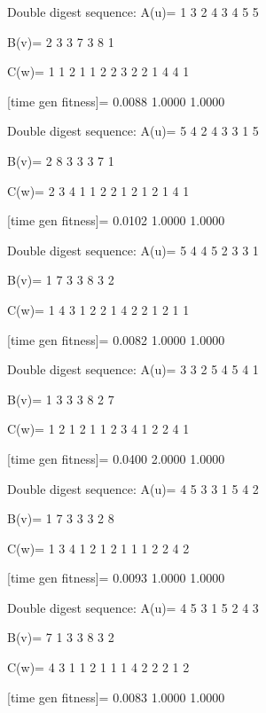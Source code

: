 Double digest sequence:
A(u)=
     1     3     2     4     3     4     5     5

B(v)=
     2     3     3     7     3     8     1

C(w)=
     1     1     2     1     1     2     2     3     2     2     1     4     4     1

[time gen fitness]=
    0.0088    1.0000    1.0000

Double digest sequence:
A(u)=
     5     4     2     4     3     3     1     5

B(v)=
     2     8     3     3     3     7     1

C(w)=
     2     3     4     1     1     2     2     1     2     1     2     1     4     1

[time gen fitness]=
    0.0102    1.0000    1.0000

Double digest sequence:
A(u)=
     5     4     4     5     2     3     3     1

B(v)=
     1     7     3     3     8     3     2

C(w)=
     1     4     3     1     2     2     1     4     2     2     1     2     1     1

[time gen fitness]=
    0.0082    1.0000    1.0000

Double digest sequence:
A(u)=
     3     3     2     5     4     5     4     1

B(v)=
     1     3     3     3     8     2     7

C(w)=
     1     2     1     2     1     1     2     3     4     1     2     2     4     1

[time gen fitness]=
    0.0400    2.0000    1.0000

Double digest sequence:
A(u)=
     4     5     3     3     1     5     4     2

B(v)=
     1     7     3     3     3     2     8

C(w)=
     1     3     4     1     2     1     2     1     1     1     2     2     4     2

[time gen fitness]=
    0.0093    1.0000    1.0000

Double digest sequence:
A(u)=
     4     5     3     1     5     2     4     3

B(v)=
     7     1     3     3     8     3     2

C(w)=
     4     3     1     1     2     1     1     1     4     2     2     2     1     2

[time gen fitness]=
    0.0083    1.0000    1.0000

